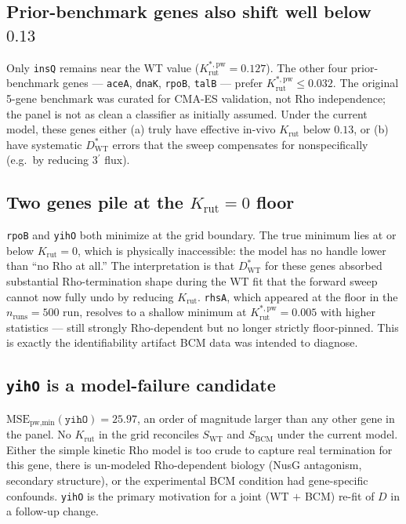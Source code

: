 \documentclass[11pt]{article}
\newcommand{\Krut}{K_{\text{rut}}}
\newcommand{\Dstar}{D^{\!*}}
\newcommand{\DstarWT}{\Dstar_{\text{WT}}}
\newcommand{\SWT}{S_{\text{WT}}}
\newcommand{\SBCM}{S_{\text{BCM}}}
\begin{document}
\subsection{Prior-benchmark genes also shift well below $0.13$}

Only \texttt{insQ} remains near the WT value ($K^{*,\text{pw}}_{\text{rut}} =
0.127$). The other four prior-benchmark genes --- \texttt{aceA},
\texttt{dnaK}, \texttt{rpoB}, \texttt{talB} --- prefer
$K^{*,\text{pw}}_{\text{rut}} \le 0.032$. The original 5-gene benchmark was
curated for CMA-ES validation, not Rho independence; the panel is not
as clean a classifier as initially assumed. Under the current model,
these genes either (a) truly have effective in-vivo $\Krut$ below
$0.13$, or (b) have systematic $\DstarWT$ errors that the sweep
compensates for nonspecifically (e.g.\ by reducing 3$^\prime$ flux).

\subsection{Two genes pile at the $\Krut=0$ floor}

\texttt{rpoB} and \texttt{yihO} both minimize at the grid boundary. The
true minimum lies at or below $\Krut=0$, which is physically
inaccessible: the model has no handle lower than ``no Rho at all.'' The
interpretation is that $\DstarWT$ for these genes absorbed substantial
Rho-termination shape during the WT fit that the forward sweep cannot
now fully undo by reducing $\Krut$. \texttt{rhsA}, which appeared at
the floor in the $n_{\text{runs}}=500$ run, resolves to a shallow
minimum at $K^{*,\text{pw}}_{\text{rut}} = 0.005$ with higher statistics
--- still strongly Rho-dependent but no longer strictly
floor-pinned. This is exactly the identifiability artifact BCM data was
intended to diagnose.

\subsection{\texttt{yihO} is a model-failure candidate}

$\text{MSE}_{\text{pw,min}}(\texttt{yihO}) = 25.97$, an order of
magnitude larger than any other gene in the panel. No $\Krut$ in the
grid reconciles $\SWT$ and $\SBCM$ under the current model. Either the
simple kinetic Rho model is too crude to capture real termination for
this gene, there is un-modeled Rho-dependent biology (NusG antagonism,
secondary structure), or the experimental BCM condition had
gene-specific confounds. \texttt{yihO} is the primary motivation for a
joint (WT $+$ BCM) re-fit of $D$ in a follow-up change.
\end{document}
